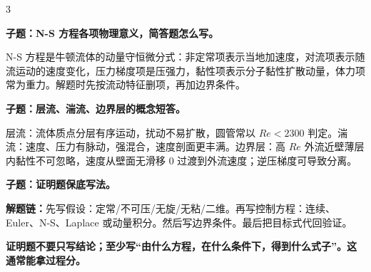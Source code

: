 \documentclass[a4paper]{article}
\newcommand{\qt}[1]{\vspace{0.10pt}\colorbox{Q}{\parbox{\dimexpr\linewidth-2\fboxsep}{\color{white}\bfseries #1}}\par}
\newcommand{\ans}[1]{\colorbox{G}{\parbox{\dimexpr\linewidth-2\fboxsep}{#1}}\par}
\newcommand{\warn}[1]{\colorbox{Y}{\parbox{\dimexpr\linewidth-2\fboxsep}{\color{E}\bfseries #1}}\par}
\newcommand{\chain}[1]{{\color{A}\bfseries 解题链：}#1\par}
\begin{document}
\begin{multicols}{3}
\qt{子题：N-S 方程各项物理意义，简答题怎么写。}
\ans{N-S 方程是牛顿流体的动量守恒微分式：非定常项表示当地加速度，对流项表示随流运动的速度变化，压力梯度项是压强力，黏性项表示分子黏性扩散动量，体力项常为重力。解题时先按流动特征删项，再加边界条件。}

\qt{子题：层流、湍流、边界层的概念短答。}
\ans{层流：流体质点分层有序运动，扰动不易扩散，圆管常以 $Re<2300$ 判定。湍流：速度、压力有脉动，强混合，速度剖面更丰满。边界层：高 $Re$ 外流近壁薄层内黏性不可忽略，速度从壁面无滑移 0 过渡到外流速度；逆压梯度可导致分离。}

\qt{子题：证明题保底写法。}
\chain{先写假设：定常/不可压/无旋/无粘/二维。再写控制方程：连续、Euler、N-S、Laplace 或动量积分。然后写边界条件。最后把目标式代回验证。}
\warn{证明题不要只写结论；至少写“由什么方程，在什么条件下，得到什么式子”。这通常能拿过程分。}



\end{multicols}
\end{document}

